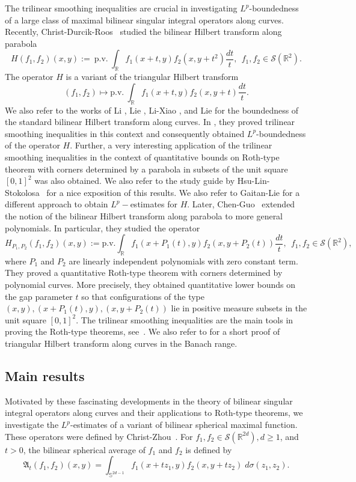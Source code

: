 \documentclass[a4paper,reqno]{amsart}
\theoremstyle{definition}
\theoremstyle{remark}
\numberwithin{equation}{section}
\newcommand{\R}{{\mathbb {R}}}
\begin{document}
	The trilinear smoothing inequalities are crucial in investigating $L^p$-boundedness of a large class of maximal bilinear singular integral operators along curves. Recently,  Christ-Durcik-Roos~\cite{CDR} studied the bilinear Hilbert transform along parabola 
	\[H(f_1,f_2)(x,y):=~\text{p.v.}~\int_{\R}f_1(x+t, y)f_2(x, y+t^2)\frac{dt}t,~~ f_1, f_2\in \mathscr S(\R^2).\]
	The operator $H$ is a variant of the triangular Hilbert transform
	\[(f_1,f_2)\mapsto \text{p.v.}~\int_{\R}f_1(x+t,y)f_2(x,y+t)\frac{dt}t.\]
	We also refer to the works of Li \cite{Li2013}, Lie \cite{Lie2015}, Li-Xiao \cite{LiXiao}, and Lie \cite{Lie2018} for the boundedness of the standard bilinear Hilbert transform along curves. In \cite{CDR}, they proved trilinear smoothing inequalities in this context and consequently obtained $L^p$-boundedness of the operator $H$. Further, a very interesting application of the trilinear smoothing inequalities in the context of quantitative bounds on Roth-type theorem with corners determined by a parabola in subsets of the unit square $[0,1]^2$ was also obtained. We also refer to the study guide by Hsu-Lin-Stokolosa~\cite{studyguidetrilinearsmoothing} for a nice exposition of this results. We also refer to Gaitan-Lie \cite{GaitanLie2024} for a different approach to obtain $L^p-$estimates for $H$. Later, Chen-Guo~\cite{CG} extended the notion of the bilinear Hilbert transform along parabola to more general polynomials. In particular, they studied the operator 
	\[H_{P_1,P_2}(f_1,f_2)(x,y):=\text{p.v.}\int_{\R}f_1(x+P_1(t), y)f_2(x, y+P_2(t))\frac{dt}t,~~ f_1, f_2\in \mathscr S(\R^2),\]
	where $P_1$ and $P_2$ are linearly independent polynomials with zero constant term.  They proved a quantitative Roth-type theorem with corners determined by polynomial curves. More precisely, they obtained quantitative lower bounds on the gap parameter $t$ so that configurations of the type $(x,y), (x+P_1(t), y), (x, y+P_2(t))$ lie in positive measure subsets in the unit square $[0,1]^2.$ The trilinear smoothing inequalities are the main tools in proving the Roth-type theorems, see~\cite{CDR, CG}. We also refer to \cite{HL2024} for a short proof of triangular Hilbert transform along curves in the Banach range.
	
	\subsection{Main results} Motivated by these fascinating developments in the theory of bilinear singular integral operators along curves and their applications to Roth-type theorems, we investigate the $L^p$-estimates of a variant of bilinear spherical maximal function. These operators were defined by Christ-Zhou~\cite{ChristZhou}. For $f_1,f_2\in\mathscr{S}(\R^{2d}), d\geq 1$, and $t>0$, the bilinear spherical average of $f_1$ and $f_2$ is defined by
	\[\mathfrak{A}_t(f_1,f_2)(x,y)=\int_{\mathbb S^{2d-1}}f_1(x+tz_1,y)f_2(x,y+tz_2)\;d\sigma(z_1,z_2).\]
	
\end{document}

